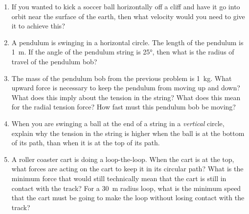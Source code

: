 \begin{enumerate}
	\item If you wanted to kick a soccer ball horizontally off a cliff and have it go into orbit near the surface of the earth, then what velocity would you need to give it to achieve this?
	
	\item A pendulum is swinging in a horizontal circle. The length of the pendulum is \SI{1}{m}. If the angle of the pendulum string is \ang{25}, then what is the radius of travel of the pendulum bob?
	
	\item The mass of the pendulum bob from the previous problem is \SI{1}{kg}. What upward force is necessary to keep the pendulum from moving up and down? What does this imply about the tension in the string? What does this mean for the radial tension force? How fast must this pendulum bob be moving?
	
	\item When you are swinging a ball at the end of a string in a \emph{vertical} circle, explain why the tension in the string is higher when the ball is at the bottom of its path, than when it is at the top of its path.
	
	\item A roller coaster cart is doing a loop-the-loop. When the cart is at the top, what forces are acting on the cart to keep it in its circular path? What is the minimum force that would still technically mean that the cart is still in contact with the track? For a \SI{30}{m} radius loop, what is the minimum speed that the cart must be going to make the loop without losing contact with the track?   
	
\end{enumerate}